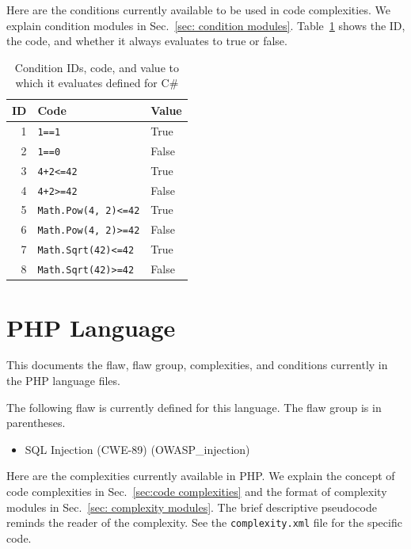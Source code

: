 \documentclass[12pt]{article}
\newcommand{\CSharp}{C{\fontseries{b}\selectfont\#}}
\begin{document}
\newpage

Here are the conditions currently available to be used in code complexities.
We explain condition modules in Sec.~\ref{sec: condition modules}.
Table~\ref{tab:condition IDs for CSharp} shows the ID, the code, and whether it
always evaluates to true or false.

\begin{table}[H]
\centering
\caption{Condition IDs, code, and value to which it evaluates defined for
  \CSharp}
\begin{tabular}{|r|l|l|}
\hline
\textbf{ID} & \textbf{Code} & \textbf{Value} \\
\hline
1 & \verb|1==1| & True \\
\hline
2 & \verb|1==0| & False \\
\hline
3 & \verb|4+2<=42| & True \\
\hline
4 & \verb|4+2>=42| & False \\
\hline
5 & \verb|Math.Pow(4, 2)<=42| & True \\
\hline
6 & \verb|Math.Pow(4, 2)>=42| & False \\
\hline
7 & \verb|Math.Sqrt(42)<=42| & True \\
\hline
8 & \verb|Math.Sqrt(42)>=42| & False \\
\hline
\end{tabular}
\label{tab:condition IDs for CSharp}
\end{table}


\section{PHP Language}
\label{sec:PHP language}

This documents the flaw, flaw group, complexities, and conditions currently in the
PHP language files.

The following flaw is currently defined for this language.  The flaw group is in
parentheses.
\begin{itemize}
    \item SQL Injection (CWE-89) (OWASP\_injection)
\end{itemize}

\newpage

Here are the complexities currently available in PHP.
We explain the concept of code complexities in Sec.~\ref{sec:code complexities} and
the format of complexity modules in Sec.~\ref{sec: complexity modules}.
The brief descriptive pseudocode reminds the reader of the complexity.
See the \verb|complexity.xml| file for the specific code.
\end{document}
